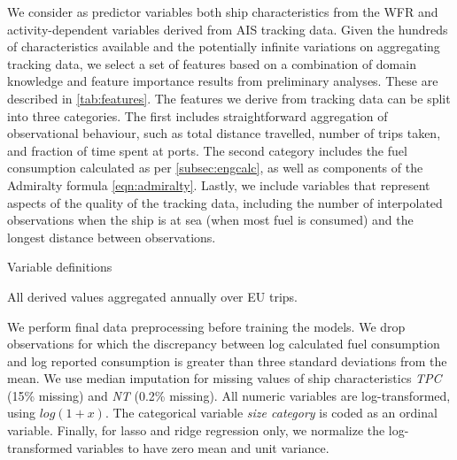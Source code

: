 We consider as predictor variables both ship characteristics from the \ac{WFR} and activity-dependent variables derived from \ac{AIS} tracking data. Given the hundreds of characteristics available and the potentially infinite variations on aggregating tracking data, we select a set of features based on a combination of domain knowledge and feature importance results from preliminary analyses. These are described in \autoref{tab:features}. The features we derive from tracking data can be split into three categories. The first includes straightforward aggregation of observational behaviour, such as total distance travelled, number of trips taken, and fraction of time spent at ports. The second category includes the fuel consumption calculated as per \autoref{subsec:engcalc}, as well as components of the Admiralty formula \eqref{eqn:admiralty}. Lastly, we include variables that represent aspects of the quality of the tracking data, including the number of interpolated observations when the ship is at sea (when most fuel is consumed) and the longest distance between observations.

\begin{table}
    \centering
    \begin{adjustbox}{max width=\textwidth}
    \begin{threeparttable}
        \caption{Variable definitions}
        \label{tab:features}
        
        \begin{tablenotes}[flushleft]\small
            \item All derived values aggregated annually over EU trips.
        \end{tablenotes}
    \end{threeparttable}
    \end{adjustbox}
\end{table}


We perform final data preprocessing before training the models. We drop observations for which the discrepancy between log calculated fuel consumption and log reported consumption is greater than three standard deviations from the mean. We use median imputation for missing values of ship characteristics \textit{\ac{TPC}} (15\% missing) and \textit{\ac{NT}} (0.2\% missing). All numeric variables are log-transformed, using $log(1+x)$. The categorical variable \textit{size category} is coded as an ordinal variable. Finally, for lasso and ridge regression only, we normalize the log-transformed variables to have zero mean and unit variance.

